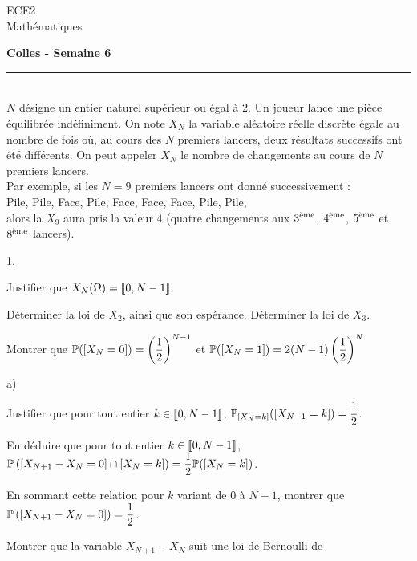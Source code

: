 \documentclass[11pt]{article}%
\begin{document}
\begin{flushleft}
ECE2 \\
Mathématiques
\end{flushleft}

\begin{center}
\textbf{\Large{Colles - Semaine 6}}
\end{center}

\hrule

\vspace*{0,2cm}



\begin{exercice}~\\
$N$ désigne un entier naturel supérieur ou égal à 2. Un joueur lance 
une pièce équilibrée indéfiniment. On note $X_N$ la variable aléatoire 
réelle discrète égale au nombre de fois où, au cours des $N$ premiers 
lancers, deux résultats successifs ont été différents. On peut appeler 
$X_N$ le \og nombre de changements \fg{} au cours de $N$ premiers 
lancers.\\
Par exemple, si les $N=9$ premiers lancers ont donné successivement :\\
Pile, Pile, Face, Pile, Face, Face, Face, Pile, Pile,\\ 
alors la \var $X_9$ aura pris la valeur $4$ (quatre changements aux 
$\eme{3}$, $\eme{4}$, $\eme{5}$ et 
$\eme{8}$ lancers).
\begin{noliste}{1.}
\item
Justifier que $X_N(\Omega)=\llb 0,N-1 \rrb$.
\item
Déterminer la loi de $X_2$, ainsi que son espérance. Déterminer la loi 
de $X_3$.
\item
Montrer que $\Prob(\Ev{X_N=0})=\left(\dfrac{1}{2}\right)^{N-1}$ et $ 
\Prob(\Ev{X_N=1})=2(N-1)\left(\dfrac{1}{2}\right)^N$
\item
\begin{noliste}{a)}
\item
Justifier que pour tout entier $k\in\llb 0,N-1 \rrb$, $ 
\Prob_{\Ev{X_N=k}}(\Ev{X_{N+1}=k})=\dfrac{1}{2}$.
\item
En déduire que pour tout entier $k\in\llb 0,N-1 \rrb$, $ 
\Prob\left(\Ev{X_{N+1}-X_N=0}\cap\Ev{X_N=k}\right)=\dfrac{1}{2}
\Prob(\Ev{X_N=k})$.
\item
En sommant cette relation pour $k$ variant de $0$ à $N-1$, montrer que 
$\Prob\left(\Ev{X_{N+1}-X_N=0}\right)=\dfrac{1}{2}$.
\item
Montrer que la variable $X_{N+1}-X_N$ suit une loi de Bernoulli de 

\end{noliste}
\end{noliste}
\end{exercice}
\end{document}
